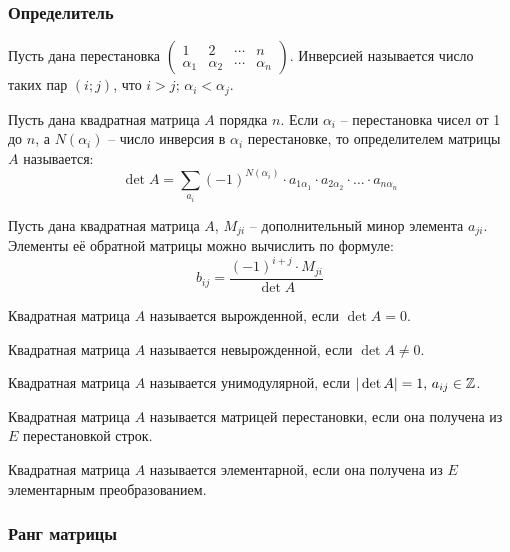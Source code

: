 \documentclass[12pt]{article}
\begin{document}
\subsubsection{Определитель}

\begin{definition}
    Пусть дана перестановка $\begin{pmatrix}
        1 & 2 & \cdots & n\\
        \alpha_1 & \alpha_2 & \cdots & \alpha_n
    \end{pmatrix}$. Инверсией называется число таких пар $(i;j)$, что $i>j;\,\alpha_i<\alpha_j$.
\end{definition}
\begin{definition}
    Пусть дана квадратная матрица $A$ порядка $n$. Если $\alpha_i$ – перестановка чисел от 1 до $n$, а $N(\alpha_i)$ – число инверсия в $\alpha_i$ перестановке, то определителем матрицы $A$ называется:
    $$\det A=\sum_{a_i}(-1)^{N(\alpha_i)}\cdot a_{1\alpha_1}\cdot a_{2\alpha_2}\cdot\ldots\cdot a_{n\alpha_n}$$
\end{definition}
\begin{theorem}
    Пусть дана квадратная матрица $A$, $M_{ji}$ – дополнительный минор элемента $a_{ji}$. Элементы её обратной матрицы можно вычислить по формуле:
    $$b_{ij}=\frac{(-1)^{i+j}\cdot M_{ji}}{\det A}$$
\end{theorem}
\begin{definition}
    Квадратная матрица $A$ называется вырожденной, если $\det A=0$.
\end{definition}
\begin{definition}
    Квадратная матрица $A$ называется невырожденной, если $\det A\neq0$.
\end{definition}
\begin{definition}
    Квадратная матрица $A$ называется унимодулярной, если $|\det A|=1,\,a_{ij}\in\mathbb{Z}$.
\end{definition}
\begin{definition}
    Квадратная матрица $A$ называется матрицей перестановки, если она получена из $E$ перестановкой строк.
\end{definition}
\begin{definition}
    Квадратная матрица $A$ называется элементарной, если она получена из $E$ элементарным преобразованием.
\end{definition}

\subsubsection{Ранг матрицы}
\end{document}
